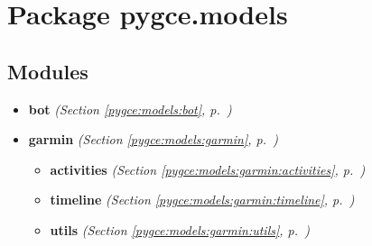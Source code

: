 %
%
%


\section{Package pygce.models}

    \label{pygce:models}


\subsection{Modules}

\begin{itemize}
\setlength{\parskip}{0ex}
\item \textbf{bot}
  \textit{(Section \ref{pygce:models:bot}, p.~\pageref{pygce:models:bot})}

\item \textbf{garmin}
  \textit{(Section \ref{pygce:models:garmin}, p.~\pageref{pygce:models:garmin})}

  \begin{itemize}
\setlength{\parskip}{0ex}
    \item \textbf{activities}
  \textit{(Section \ref{pygce:models:garmin:activities}, p.~\pageref{pygce:models:garmin:activities})}

    \item \textbf{timeline}
  \textit{(Section \ref{pygce:models:garmin:timeline}, p.~\pageref{pygce:models:garmin:timeline})}

    \item \textbf{utils}
  \textit{(Section \ref{pygce:models:garmin:utils}, p.~\pageref{pygce:models:garmin:utils})}

  \end{itemize}
\end{itemize}



